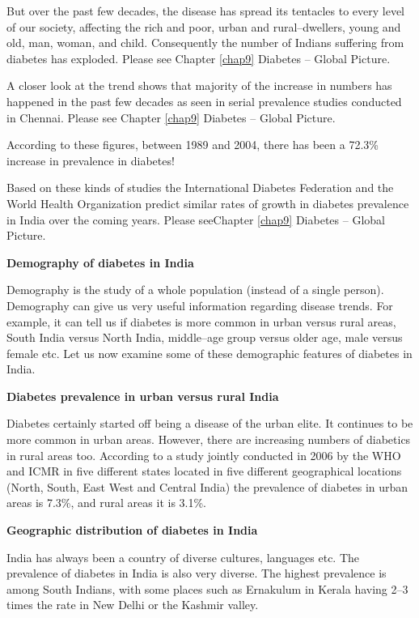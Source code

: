 But over the past few decades, the disease has spread its tentacles to every level of our society, affecting the rich and poor, urban and rural–dwellers, young and old, man, woman, and child. Consequently the number of Indians suffering from diabetes has exploded. Please see Chapter \ref{chap9} Diabetes – Global Picture.

A closer look at the trend shows that majority of the increase in numbers has happened in the past few decades as seen in serial prevalence studies conducted in Chennai. Please see Chapter \ref{chap9} Diabetes – Global Picture.

According to these figures, between 1989 and 2004, there has been a 72.3\% increase in prevalence in diabetes!

Based on these kinds of studies the International Diabetes Federation and the World Health Organization predict similar rates of growth in diabetes prevalence in India over the coming years. Please see\break Chapter \ref{chap9} Diabetes – Global Picture.

\noindent\textbf{Demography of diabetes in India}

Demography is the study of a whole population (instead of a single person). Demography can give us very useful information regarding disease trends. For example, it can tell us if diabetes is more common in urban versus rural areas, South India versus North India, middle–age group versus older age, male versus female etc. Let us now examine some of these demographic features of diabetes in India.

\noindent\textbf{Diabetes prevalence in urban versus rural India}

Diabetes certainly started off being a disease of the urban elite. It continues to be more common in urban areas. However, there are increasing numbers of diabetics in rural areas too. According to a study jointly conducted in 2006 by the WHO and ICMR in five different states located in five different geographical locations (North, South, East West and Central India) the prevalence of diabetes in urban areas is 7.3\%, and rural areas it is 3.1\%.

\noindent\textbf{Geographic distribution of diabetes in India}

India has always been a country of diverse cultures, languages etc. The prevalence of diabetes in India is also very diverse. The highest prevalence is among South Indians, with some places such as Ernakulum in Kerala having 2–3 times the rate in New Delhi or the Kashmir valley.

